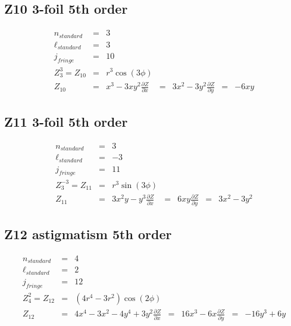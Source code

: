 \documentclass[10pt]{article}
\begin{document}
  \subsection{Z10 3-foil 5th order}
    \begin{subequations}
    \begin{eqnarray}
        n_{standard} &=&3\\
        \ell_{standard} &=&3\\
        j_{fringe} &=&10\\
        Z_{3}^{3} = Z_{10} &=& r^{3} \cos{\left(3 \phi \right)}\\
        Z_{10} &=& x^{3} - 3 x y^{2}
        \frac{\partial Z}{\partial x} &=& 3 x^{2} - 3 y^{2}
        \frac{\partial Z}{\partial y} &=& - 6 x y
    \end{eqnarray}
    \end{subequations}
  \subsection{Z11 3-foil 5th order}
    \begin{subequations}
    \begin{eqnarray}
        n_{standard} &=&3\\
        \ell_{standard} &=&-3\\
        j_{fringe} &=&11\\
        Z_{3}^{-3} = Z_{11} &=& r^{3} \sin{\left(3 \phi \right)}\\
        Z_{11} &=& 3 x^{2} y - y^{3}
        \frac{\partial Z}{\partial x} &=& 6 x y
        \frac{\partial Z}{\partial y} &=& 3 x^{2} - 3 y^{2}
    \end{eqnarray}
    \end{subequations}
  \subsection{Z12 astigmatism 5th order}
    \begin{subequations}
    \begin{eqnarray}
        n_{standard} &=&4\\
        \ell_{standard} &=&2\\
        j_{fringe} &=&12\\
        Z_{4}^{2} = Z_{12} &=& \left(4 r^{4} - 3 r^{2}\right) \cos{\left(2 \phi \right)}\\
        Z_{12} &=& 4 x^{4} - 3 x^{2} - 4 y^{4} + 3 y^{2}
        \frac{\partial Z}{\partial x} &=& 16 x^{3} - 6 x
        \frac{\partial Z}{\partial y} &=& - 16 y^{3} + 6 y
    \end{eqnarray}
    \end{subequations}
\end{document}
